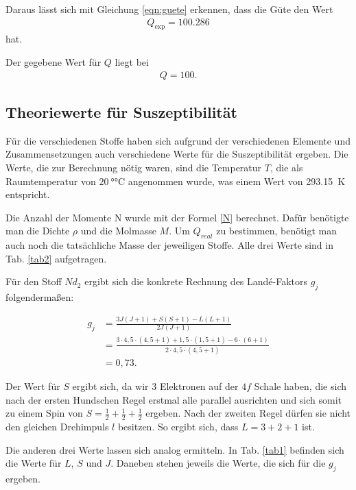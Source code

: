 \noindent Daraus lässt sich mit Gleichung \eqref{eqn:guete} erkennen, dass die Güte den Wert 
\begin{align*} 
    Q_\text{exp} = \num{100.286}
\end{align*}
hat. 

\noindent Der gegebene Wert für $Q$ liegt bei 
\begin{align*} 
    Q = \num{100}.
\end{align*}


\subsection{Theoriewerte für Suszeptibilität} 
Für die verschiedenen Stoffe haben sich aufgrund der verschiedenen Elemente und Zusammensetzungen auch verschiedene 
Werte für die Suszeptibilität ergeben. 
Die Werte, die zur Berechnung nötig waren, sind die Temperatur $T$, die als Raumtemperatur von $\SI{20}{\degree\celsius}$ angenommen wurde, was einem Wert von \SI{293.15}{\kelvin} entspricht. 

Die Anzahl der Momente N wurde mit der Formel \eqref{N} berechnet. Dafür benötigte man die Dichte $\rho$ und die Molmasse $M$. Um $Q_{real}$ zu bestimmen, benötigt man auch noch die tatsächliche Masse der jeweiligen Stoffe. Alle drei Werte sind in Tab. \ref{tab2} aufgetragen. 



Für den Stoff $Nd_2$ ergibt sich die konkrete Rechnung des Landé-Faktors $g_j$ folgendermaßen: 

\begin{align*}
    g_j &= \frac{3 J (J+1) + S (S+1) - L (L+1)}{2 J (J+1)} \\
        &= \frac{3 \cdot 4,5 \cdot(4,5 + 1) + 1,5 \cdot (1,5 +1) - 6 \cdot (6+1)}{2 \cdot 4,5 \cdot (4,5 + 1)} \\
        &= 0,73.
\end{align*} 

Der Wert für $S$ ergibt sich, da wir \num{3} Elektronen auf der $4f$ Schale haben, die sich nach der ersten Hundschen Regel erstmal alle parallel ausrichten und sich somit zu einem Spin von $S = \frac{1}{2}+ \frac{1}{2} + \frac{1}{2}$ ergeben. Nach der zweiten Regel dürfen sie nicht den gleichen Drehimpuls $l$ besitzen. So ergibt sich, dass $L = 3 + 2 + 1$ ist. 

\noindent Die anderen drei Werte lassen sich analog ermitteln. 
In Tab. \ref{tab1} befinden sich die Werte für $L$, $S$ und $J$. Daneben stehen jeweils die Werte, die sich für 
die $g_j$ ergeben. 

